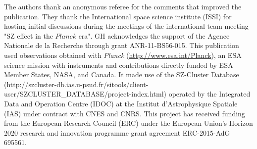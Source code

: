 \documentclass[traditabstract,a4,twocolumn]{aa}
\begin{document}
\begin{acknowledgements}
The authors thank an anonymous referee for the comments that improved the publication. They thank the International space science institute (ISSI) for hosting initial discussions during the meetings of the
international team meeting "SZ effect in the $Planck$ era". GH acknowledges the support of the Agence Nationale de la Recherche
through grant ANR-11-BS56-015. This publication used observations obtained with \emph{Planck} (\url{http://www.esa.int/Planck}), an ESA science mission with instruments and contributions directly funded by ESA Member States, NASA, and Canada. It made use of the SZ-Cluster Database (http://szcluster-db.ias.u-psud.fr/sitools/client-user/SZCLUSTER\_DATABASE/project-index.html) operated by the Integrated Data and Operation Centre (IDOC) at the Institut d'Astrophysique Spatiale (IAS) under contract with CNES and CNRS. This project has received funding from the European Research Council (ERC) under the European Union's Horizon 2020 research and innovation programme grant agreement ERC-2015-AdG 695561.
\end{acknowledgements}



\end{document}
